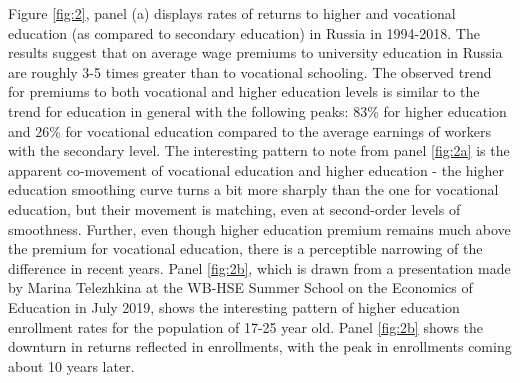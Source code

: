 \documentclass[12pt,a4paper]{article}
\numberwithin{equation}{section}
\begin{document}
Figure \ref{fig:2}, panel (a) displays rates of returns to higher and vocational education (as compared to secondary education) in Russia in 1994-2018. The results suggest that on average wage premiums to university education in Russia are roughly 3-5 times greater than to vocational schooling. The observed trend for premiums to both vocational and higher education levels is similar to the trend for education in general with the following peaks: 83\% for higher education and 26\% for vocational education compared to the average earnings of workers with the secondary level. The interesting pattern to note from panel \ref{fig:2a} is the apparent co-movement of vocational education and higher education - the higher education smoothing curve turns a bit more sharply than the one for vocational education, but their movement is matching, even at second-order levels of smoothness. Further, even though higher education premium remains much above the premium for vocational education, there is a perceptible narrowing of the difference in recent years. Panel \ref{fig:2b}, which is drawn from a presentation made by Marina Telezhkina at the WB-HSE Summer School on the Economics of Education in July 2019, shows the interesting pattern of higher education enrollment rates for the population of 17-25 year old. Panel \ref{fig:2b} shows the downturn in returns reflected in enrollments, with the peak in enrollments coming about 10 years later. 
\\
\end{document}

